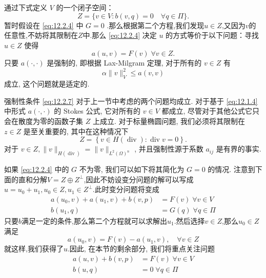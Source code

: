 通过下式定义 $V$ 的一个闭子空间：
\begin{equation}\label{eq:12.2.5}
    Z = \{ v \in V : b\left( {v,q}\right) = 0\quad \forall q \in \varPi \} .
\end{equation}
\qquad 暂时假设在 \eqref{eq:12.2.4} 中 $G = 0$ .那么根据第二个方程,我们发现$u\in Z$,又因为$v$的任意性,不妨将其限制在$Z$中.那么 \eqref{eq:12.2.4} 决定 $u$ 的方式等价于以下问题：寻找 $u \in  Z$ 使得
\begin{equation}\label{eq:12.2.6}
a\left( {u,v}\right)  = F\left( v\right) \;\forall v \in  Z.
\end{equation}
\qquad 只要 $a\left( {\cdot , \cdot  }\right)$ 是强制的, 即根据 Lax-Milgram 定理, 对于所有的 $v \in  Z$ 有
\begin{equation}\label{eq:12.2.7}
\alpha \| v\|_{V}^{2} \leq  a\left( {v,v}\right)
\end{equation}
成立, 这个问题就是适定的.\par
强制性条件 \eqref{eq:12.2.7} 对于上一节中考虑的两个问题均成立. 对于基于 \eqref{eq:12.1.4} 中形式 $a\left( {\cdot , \cdot  }\right)$ 的 Stokes 公式, 它对所有的 $v \in  V$ 都成立, 尽管对于其他公式它只会在散度为零的函数子集 $Z$ 上成立. 对于标量椭圆问题, 我们必须将其限制在 $z \in  Z$ 是至关重要的, 其中在这种情况下
$$
Z = \left\{  {v \in  H\left( \operatorname{div}\right)  : \operatorname{div}v = 0}\right\}  .
$$
对于 $v \in  Z,\| v\|_{H\left( \operatorname{div}\right) } = \| v\|_{{L}^{2}{\left( \Omega \right) }^{n}}$ , 并且强制性源于系数 ${a}_{ij}$ 是有界的事实.\par
如果 \eqref{eq:12.2.4} 中的 $G$ 不为零, 我们可以如下将其简化为 $G = 0$ 的情况. 注意到下面的直和分解$V=Z\oplus Z^{\bot}$,因此不妨设变分问题的解可以写成$u=u_0+u_1,u_0\in Z,u_1\in Z^{\bot}$.此时变分问题将变成
$$
\begin{aligned}
a\left( {u_0,v}\right)  + a(u_1,v)+b\left( {v,p}\right)  &= F\left( v\right) \;\forall v \in  V \\
b\left( {u_1,q}\right)  &= G\left( q\right) \;\forall q \in  \varPi
\end{aligned}
$$
只要$b$满足一定的条件,那么第二个方程就可以求解出$u_1$.然后选择$v\in Z$,那么$u_0\in Z$满足
$$
a(u_0,v)=F(v)-a(u_1,v),\quad \forall v\in Z
$$
就这样,我们获得了$u$.因此, 在本节的剩余部分, 我们将重点关注问题
\begin{equation}\label{eq:12.2.8}
\begin{aligned}
a\left( {u,v}\right)  + b\left( {v,p}\right)  &= F\left( v\right) \;\forall v \in  V \\
b\left( {u,q}\right)  &= 0\;\forall q \in  \varPi
\end{aligned}
\end{equation}
